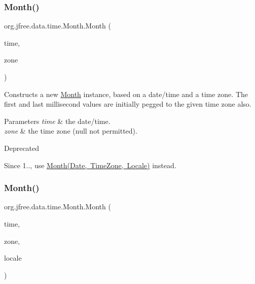 \subsubsection{\texorpdfstring{Month()}{Month()}\hspace{0.1cm}{\footnotesize\ttfamily [5/6]}}
{\footnotesize\ttfamily org.\+jfree.\+data.\+time.\+Month.\+Month (\begin{DoxyParamCaption}\item[{Date}]{time,  }\item[{Time\+Zone}]{zone }\end{DoxyParamCaption})}

Constructs a new {\ttfamily \mbox{\hyperlink{classorg_1_1jfree_1_1data_1_1time_1_1_month}{Month}}} instance, based on a date/time and a time zone. The first and last millisecond values are initially pegged to the given time zone also.


\begin{DoxyParams}{Parameters}
{\em time} & the date/time. \\
\hline
{\em zone} & the time zone ({\ttfamily null} not permitted).\\
\hline
\end{DoxyParams}
\begin{DoxyRefDesc}{Deprecated}
\item[\mbox{\hyperlink{deprecated__deprecated000269}{Deprecated}}]Since 1.., use \mbox{\hyperlink{classorg_1_1jfree_1_1data_1_1time_1_1_month_a4123b55e72a84ec809ce1da11abe2d78}{Month(\+Date, Time\+Zone, Locale)}} instead. \end{DoxyRefDesc}
\mbox{\label{classorg_1_1jfree_1_1data_1_1time_1_1_month_a4123b55e72a84ec809ce1da11abe2d78}} 
\subsubsection{\texorpdfstring{Month()}{Month()}\hspace{0.1cm}{\footnotesize\ttfamily [6/6]}}
{\footnotesize\ttfamily org.\+jfree.\+data.\+time.\+Month.\+Month (\begin{DoxyParamCaption}\item[{Date}]{time,  }\item[{Time\+Zone}]{zone,  }\item[{Locale}]{locale }\end{DoxyParamCaption})}

